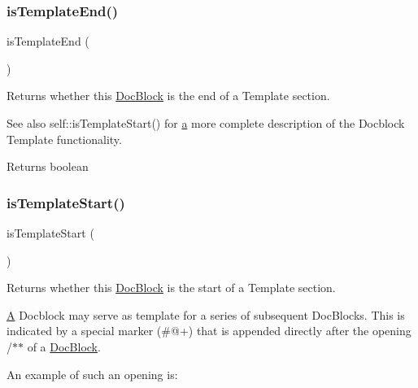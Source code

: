 \subsubsection{\texorpdfstring{is\+Template\+End()}{isTemplateEnd()}}
{\footnotesize\ttfamily is\+Template\+End (\begin{DoxyParamCaption}{ }\end{DoxyParamCaption})}

Returns whether this \mbox{\hyperlink{classphp_documentor_1_1_reflection_1_1_doc_block}{Doc\+Block}} is the end of a Template section.

\begin{DoxySeeAlso}{See also}
self\+::is\+Template\+Start() for \mbox{\hyperlink{interfacea}{a}} more complete description of the Docblock Template functionality.
\end{DoxySeeAlso}
\begin{DoxyReturn}{Returns}
boolean 
\end{DoxyReturn}
\mbox{\label{classphp_documentor_1_1_reflection_1_1_doc_block_a98bb0c3ca0dfd8c974980e05af0a4432}} 
\subsubsection{\texorpdfstring{is\+Template\+Start()}{isTemplateStart()}}
{\footnotesize\ttfamily is\+Template\+Start (\begin{DoxyParamCaption}{ }\end{DoxyParamCaption})}

Returns whether this \mbox{\hyperlink{classphp_documentor_1_1_reflection_1_1_doc_block}{Doc\+Block}} is the start of a Template section.

\mbox{\hyperlink{class_a}{A}} Docblock may serve as template for a series of subsequent Doc\+Blocks. This is indicated by a special marker ({\ttfamily \#@+}) that is appended directly after the opening {\ttfamily /$\ast$$\ast$} of a \mbox{\hyperlink{classphp_documentor_1_1_reflection_1_1_doc_block}{Doc\+Block}}.

An example of such an opening is\+:


\begin{DoxyCode}

\end{DoxyCode}


